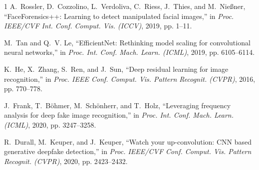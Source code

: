 \documentclass[journal,10pt,twocolumn]{IEEEtran}
\begin{document}

\begin{thebibliography}{1}
A.~Rossler, D.~Cozzolino, L.~Verdoliva, C.~Riess, J.~Thies, and M.~Nie{\ss}ner, ``FaceForensics++: Learning to detect manipulated facial images,'' in \emph{Proc. IEEE/CVF Int. Conf. Comput. Vis. (ICCV)}, 2019, pp. 1--11.

M.~Tan and Q.~V. Le, ``EfficientNet: Rethinking model scaling for convolutional neural networks,'' in \emph{Proc. Int. Conf. Mach. Learn. (ICML)}, 2019, pp. 6105--6114.

K.~He, X.~Zhang, S.~Ren, and J.~Sun, ``Deep residual learning for image recognition,'' in \emph{Proc. IEEE Conf. Comput. Vis. Pattern Recognit. (CVPR)}, 2016, pp. 770--778.

J.~Frank, T.~B{\"o}hmer, M.~Sch{\"o}nherr, and T.~Holz, ``Leveraging frequency analysis for deep fake image recognition,'' in \emph{Proc. Int. Conf. Mach. Learn. (ICML)}, 2020, pp. 3247--3258.

R.~Durall, M.~Keuper, and J.~Keuper, ``Watch your up-convolution: CNN based generative deepfake detection,'' in \emph{Proc. IEEE/CVF Conf. Comput. Vis. Pattern Recognit. (CVPR)}, 2020, pp. 2423--2432.
\end{thebibliography}
\end{document}
